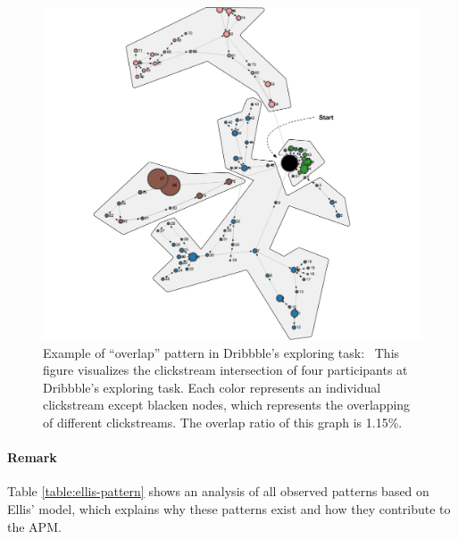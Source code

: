 \begin{figure}[H]
    \centering
    \includegraphics[width=1\textwidth]{figures/overlap2}
    \caption{Example of ``overlap'' pattern in Dribbble's exploring task: \
    This figure visualizes the clickstream intersection of four participants at Dribbble's exploring task. Each color represents an individual clickstream except blacken nodes, which represents the overlapping of different clickstreams.
    The overlap ratio of this graph is 1.15\%.}
    \label{fig:overlap-example-2}
\end{figure}

\paragraph{Remark} Table \ref{table:ellis-pattern} shows an analysis of all observed patterns
based on Ellis' model, which explains why these patterns exist and how they contribute to the APM.

